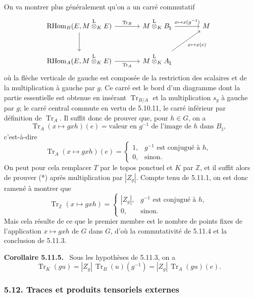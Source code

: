 \documentclass[11pt]{article}
\newenvironment{statement}[1]{\par\medskip\noindent\textbf{#1.}\ }{\par\medskip}
\providecommand{\RHom}{\mathrm{RHom}}
\providecommand{\Tr}{\operatorname{Tr}}
\providecommand{\Tr}{\operatorname{Tr}}
\providecommand{\lten}{\overset{\mathrm L}{\otimes}}
\providecommand{\Tr}{\operatorname{Tr}}
\providecommand{\RHom}{\mathrm{RHom}}
\providecommand{\lten}{\overset{\mathrm L}{\otimes}}
\providecommand{\RHom}{\mathrm R\mathcal{H}om}
\providecommand{\lten}{\overset{\mathrm L}{\otimes}}
\providecommand{\Tr}{\operatorname{Tr}}
\providecommand{\lten}{\overset{\mathrm L}{\otimes}}
\providecommand{\lten}{\overset{\mathrm L}{\otimes}}
\providecommand{\lten}{\overset{\mathrm L}{\otimes}}
\providecommand{\RHom}{\mathrm{RHom}}
\providecommand{\Tr}{\operatorname{Tr}}
\providecommand{\lten}{\overset{\mathrm L}{\otimes}}
\begin{document}
On va montrer plus généralement qu'on a un carré commutatif
\[
\begin{tikzcd}[column sep=large,row sep=large]
\RHom_B(E,M\lten_KE) \arrow[r,"\Tr_B"] \arrow[d] & M\lten_KB_\natural \arrow[r,"x\mapsto x(g^{-1})"] & M\\
\RHom_A(E,M\lten_KE) \arrow[r,"\Tr_A"'] & M\lten_KA_\natural \arrow[ur,"x\mapsto x(e)"'] &
\end{tikzcd}
\]
où la flèche verticale de gauche est composée de la restriction des scalaires et de la multiplication à gauche par $g$. Ce carré est le bord d'un diagramme dont la partie essentielle est obtenue en insérant $\Tr_{B/A}$ et la multiplication $s_g$ à gauche par $g$; le carré central commute en vertu de 5.10.11, le carré inférieur par définition de $\Tr_A$. Il suffit donc de prouver que, pour $h\in G$, on a
\[
\Tr_A(x\mapsto gxh)(e)=\text{valeur en }g^{-1}\text{ de l'image de }h\text{ dans }B_\natural,
\]
c'est-à-dire
\begin{equation}\tag{*}
\Tr_A(x\mapsto gxh)(e)=
\begin{cases}
1,& g^{-1}\text{ est conjugué à }h,\\
0,& \text{sinon}.
\end{cases}
\end{equation}
On peut pour cela remplacer $T$ par le topos ponctuel et $K$ par $\mathbb Z$, et il suffit alors de prouver (*) après multiplication par $|Z_g|$. Compte tenu de 5.11.1, on est donc ramené à montrer que
\[
\Tr_{\mathbb Z}(x\mapsto gxh)=
\begin{cases}
|Z_g|,& g^{-1}\text{ est conjugué à }h,\\
0,& \text{sinon}.
\end{cases}
\]
Mais cela résulte de ce que le premier membre est le nombre de points fixes de l'application $x\mapsto gxh$ de $G$ dans $G$, d'où la commutativité de 5.11.4 et la conclusion de 5.11.3.

\begin{statement}{Corollaire 5.11.5}
Sous les hypothèses de 5.11.3, on a
\begin{equation}\tag{5.11.5}
\Tr_K(gu)=|Z_g|\,\Tr_B(u)(g^{-1})=|Z_g|\,\Tr_A(gu)(e).
\end{equation}
\end{statement}

\subsubsection*{5.12. Traces et produits tensoriels externes}
\end{document}
